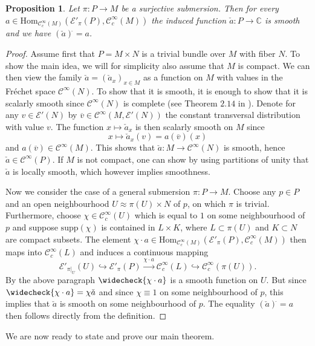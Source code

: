 \documentclass[a4paper]{amsart}
\newtheorem{prop}[dfn]{Proposition}
\newcommand{\CC}{\mathbb{C}}
\newcommand{\cE}{\mathcal{E}}
\newcommand{\Hom}{\text{Hom}}
\newcommand{\supp}{\mathord{\mathrm{supp}}}
\newcommand{\C}{\mathord{\mathcal{C}^{\infty}}}
\newcommand{\Cc}{\mathord{\mathcal{C}^{\infty}_{c}}}
\begin{document}
\begin{prop}
Let $\pi:P\to M$ be a surjective submersion. Then for every $a\in\Hom_{\Cc(M)}(\cE'_{\pi}(P),\Cc(M))$ the induced function
$\check{a}:P\to\CC$ is smooth and we have $(\check{a})^{\hat{}}=a$.
\end{prop}
\begin{proof}
Assume first that $P=M\times N$ is a trivial bundle over $M$ with fiber $N$. To show the main idea, we will for simplicity also 
assume that $M$ is compact. We can then view the family $\check{a}=(\check{a}_{x})_{x\in M}$ as a function on $M$
with values in the Fr\'{e}chet space $\C(N)$. To show that it is smooth, it is enough to show that it is scalarly smooth since $\C(N)$ is complete 
(see Theorem $2.14$ in \cite{KrMi97}). Denote for any $v\in\cE'(N)$ by $\overline{v}\in\C(M,\cE'(N))$ the constant transversal distribution with value $v$. 
The function $x\mapsto \check{a}_{x}$ is then scalarly smooth on $M$ since
\[
x\mapsto \check{a}_{x}(v)=a(\overline{v})(x)
\]
and $a(\overline{v})\in\C(M)$. This shows that $\check{a}:M\to\C(N)$ is smooth, hence $\check{a}\in\C(P)$. If $M$ is not compact,
one can show by using partitions of unity that $\check{a}$ is locally smooth, which however implies smoothness. 

Now we consider the case of a general submersion $\pi:P\to M$. Choose any $p\in P$ and an open neighbourhood $U\approx \pi(U)\times N$ of $p$, on
which $\pi$ is trivial. Furthermore, choose $\chi\in\Cc(U)$ which is equal to $1$ on some neighbourhood of $p$ 
and suppose $\supp(\chi)$ is contained in $L\times K$, where $L\subset\pi(U)$ and $K\subset N$ are compact subsets. The element
$\chi\cdot a\in\Hom_{\Cc(M)}(\cE'_{\pi}(P),\Cc(M))$ then maps into $\Cc(L)$ and induces a continuous mapping
\[
\cE'_{\pi|_{U}}(U)\hookrightarrow\cE'_{\pi}(P)\overset{\chi\cdot a}{\longrightarrow}\Cc(L)\hookrightarrow\Cc(\pi(U)).
\]
By the above paragraph $\widecheck{\chi\cdot a}$ is a smooth function on $U$. But since $\widecheck{\chi\cdot a}=\chi\check{a}$ and since $\chi\equiv 1$
on some neighbourhood of $p$, this implies that $\check{a}$ is smooth on some neighbourhood of $p$. 
The equality $(\check{a})^{\hat{}}=a$ then follows directly from the definition.
\end{proof}

We are now ready to state and prove our main theorem.
\end{document}
